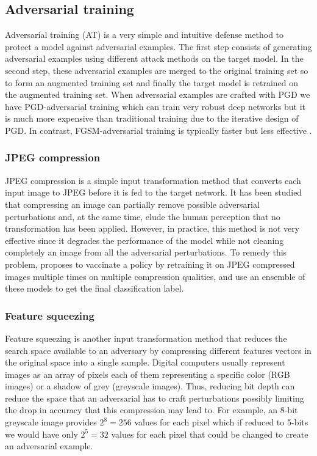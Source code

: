 \subsection{Adversarial training}
Adversarial training (AT) is a very simple and intuitive defense method to protect a model against adversarial examples. The first step consists of generating adversarial examples using different attack methods on the target model. In the second step, these adversarial examples are merged to the original training set so to form an augmented training set and finally the target model is retrained on the augmented training set. When adversarial examples are crafted with PGD we have PGD-adversarial training which can train very robust deep networks but it is much more expensive than traditional training due to the iterative design of PGD. In contrast, FGSM-adversarial training is typically faster but less effective \cite{wong2020fast}.

\subsubsection{JPEG compression}
JPEG compression \cite{dziugaite2016study} is a simple input transformation method that converts each input image to JPEG before it is fed to the target network. It has been studied that compressing an image can partially remove possible adversarial perturbations and, at the same time, elude the human perception that no transformation has been applied. However, in practice, this method is not very effective since it degrades the performance of the model while not cleaning completely an image from all the adversarial perturbations. To remedy this problem, \cite{das2018shield} proposes to vaccinate a policy by retraining it on JPEG compressed images multiple times on multiple compression qualities, and use an ensemble of these models to get the final classification label.

\subsubsection{Feature squeezing}
Feature squeezing \cite{Xu_2018} is another input transformation method that reduces the search space available to an adversary by compressing different features vectors in the original space into a single sample. Digital computers usually represent images as an array of pixels each of them representing a specific color (RGB images) or a shadow of grey (greyscale images). Thus, reducing bit depth can reduce the space that an adversarial has to craft perturbations possibly limiting the drop in accuracy that this compression may lead to. For example, an 8-bit greyscale image provides \(2^8=256\) values for each pixel which if reduced to 5-bits we would have only \(2^5=32\) values for each pixel that could be changed to create an adversarial example.